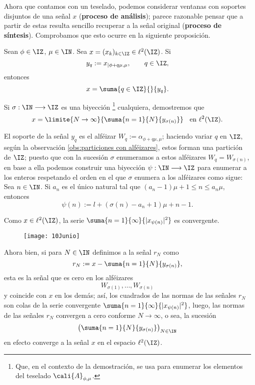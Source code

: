 \noindent
Ahora que contamos con un teselado, podemos considerar ventanas
con soportes disjuntos de una señal $x$
(\textbf{proceso de análisis}); parece razonable
pensar que a partir de estas resulta sencillo recuperar
a la señal original 
(\textbf{proceso de síntesis}). 
Comprobamos que esto ocurre en la
siguiente proposición.

\begin{prop} \label{prop: descomposicion de una señal en ventanas}
Sean $\phi \in \IZ $, $\mu \in \IN$.
Sea $x=(x_{k})_{k \in \IZ} \in \ell^{2}(\IZ)$. 
Si
\[
y_{q}:= x_{|\phi + q \mu, \mu} , \hspace{0.7cm}
q \in \IZ,
\]
entonces
\[
x=\suma{q \in \IZ}{}{y_{q}}.
\]
\end{prop}
\begin{dem}

Si $\sigma : \IN \longrightarrow \IZ$ es una biyección
\footnote{Que, en el contexto de la demostración, 
se usa para enumerar los elementos del teselado 
$\cali{A}_{\phi, \mu}$.}
cualquiera,
demostremos que
\[
x = \limite{N \rightarrow \infty }{ \suma{n=1}{N}{y_{\sigma (n)}}}
\hspace{0.2cm} \text{ en }
\ell^{2}(\IZ).
\]

\noindent 
El soporte de la señal $y_{q}$ es el alféizar
$W_{q}:= \alpha_{ \phi + q \mu, \mu}$;
haciendo variar $q$ en $\IZ$,
según la observación \ref{obs:particiones con alféizares},
estos forman una partición de $\IZ$; puesto que con
la sucesión $\sigma$ enumeramos a estos alféizares
$W_{q}=W_{\sigma(n)}$, 
en base a ella podemos construir una biyección
$\psi : \IN \longrightarrow \IZ $ para enumerar a los enteros
respetando el orden en el que $\sigma$ enumera 
a los alféizares como sigue: \\

Sea $n \in \IN$. Si $a_{n}$ es el único natural tal que
$(a_{n}-1)\mu +1 \leq n \leq a_{n} \mu $, entonces
\[
\psi (n) := l + (\sigma (n) -a_{n}+1) \mu + n-1.
\]

Como $x \in \ell^{2}(\IZ)$, la serie
$\suma{n=1}{\infty}{|x_{\psi(n)}|^{2}}$ es convergente.

\begin{figure}[H]
	\centering
	\texttt{[image: 10Junio]}
\end{figure}


Ahora bien, si para $N \in\IN$
definimos a la señal $r_{N}$ como
\[
r_{N}:= x- \suma{n=1}{N}{y_{\sigma (n)}},
\]
esta es la señal que es cero en los alféizares
\[
W_{\sigma(1)}, \ldots , W_{\sigma(n)}
\]
y coincide con $x$ en los demás; así,
los cuadrados de las normas de las señales $r_{N}$
son colas de la serie convergente 
$\suma{n=1}{\infty}{|x_{\psi(n)}|^{2}}$, luego,
las normas de las señales $r_{N}$ convergen
a cero conforme $N \rightarrow \infty$, o sea, la sucesión 
$$\left( \suma{n=1}{N}{y_{\sigma (n)}} \right)_{N \in \IN}$$
en efecto converge a la señal $x$
en el espacio $\ell^{2}(\IZ)$.
\QEDB
\end{dem}


